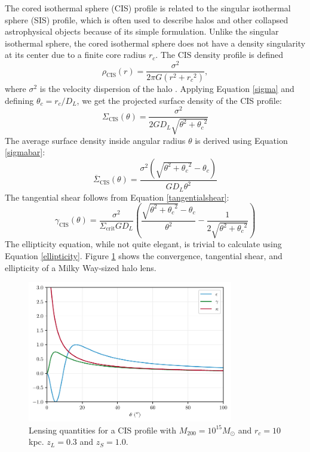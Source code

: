 \documentclass[10pt]{article}
\begin{document}
The cored isothermal sphere (CIS) profile is related to the singular isothermal sphere (SIS) profile, which is often used to describe halos and other collapsed astrophysical objects because of its simple formulation. Unlike the singular isothermal sphere, the cored isothermal sphere does not have a density singularity at its center due to a finite core radius $r_c$. The CIS density profile is defined
\begin{equation} \label{cisdensity}
\rho_\mathrm{CIS}(r) = \frac{\sigma^2}{2\pi G (r^2 + {r_c}^2)},
\end{equation}
where $\sigma^2$ is the velocity dispersion of the halo \citep{Chen2005, Shapiro1999}. Applying Equation \ref{sigma} and defining $\theta_c = r_c/D_L$, we get the projected surface density of the CIS profile:
\begin{equation}
\Sigma_\mathrm{CIS}(\theta) = \frac{\sigma^2}{2 G D_L \sqrt{\theta^2 + {\theta_c}^2}}
\end{equation}
The average surface density inside angular radius $\theta$ is derived using Equation \ref{sigmabar}:
\begin{equation}
\overline{\Sigma}_\mathrm{CIS}(\theta) = \frac{\sigma^2 \left(\sqrt{\theta^2 + {\theta_c}^2} - \theta_c \right)}{G D_L \theta^2}
\end{equation}
The tangential shear follows from Equation \ref{tangentialshear}:
\begin{equation}
\gamma_\mathrm{CIS}(\theta) = \frac{\sigma^2}{\Sigma_\mathrm{crit} G D_L} \left(\frac{\sqrt{\theta^2 + {\theta_c}^2} - \theta_c}{\theta^2} - \frac{1}{2 \sqrt{\theta^2 + {\theta_c}^2}}\right)
\end{equation}
The ellipticity equation, while not quite elegant, is trivial to calculate using Equation \ref{ellipticity}. Figure \ref{cisproperties} shows the convergence, tangential shear, and ellipticity of a Milky Way-sized halo lens.

\begin{figure}
    \centering
    \includegraphics[width=0.8\textwidth]{isothermalproperties.pdf}
    \caption{Lensing quantities for a CIS profile with $M_{200} = 10^{15} M_\odot$ and $r_c = 10$ kpc. $z_L = 0.3$ and $z_S = 1.0$.}
    \label{cisproperties}
\end{figure}
\end{document}
